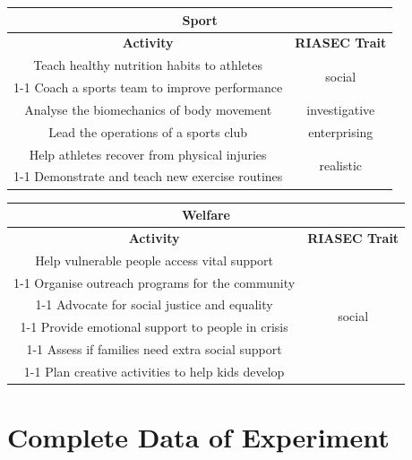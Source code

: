 \begin{table}[H]
\centering
\begin{tabular}{|c|c|}
\hline
\multicolumn{2}{|c|}{\textbf{Sport}}\\
\hline
\hline
\textbf{Activity} & \textbf{RIASEC Trait}\\
\hline
Teach healthy nutrition habits to athletes & \multirow{2}{*}{social}\\
\cline{1-1}
Coach a sports team to improve performance & \\
\hline
Analyse the biomechanics of body movement & investigative\\
\hline
Lead the operations of a sports club & enterprising\\
\hline
Help athletes recover from physical injuries & \multirow{2}{*}{realistic}\\
\cline{1-1}
Demonstrate and teach new exercise routines & \\
\hline
\end{tabular}
\end{table}

\begin{table}[H]
\centering
\begin{tabular}{|c|c|}
\hline
\multicolumn{2}{|c|}{\textbf{Welfare}}\\
\hline
\hline
\textbf{Activity} & \textbf{RIASEC Trait}\\
\hline
Help vulnerable people access vital support & \multirow{6}{*}{social}\\
\cline{1-1}
Organise outreach programs for the community & \\
\cline{1-1}
Advocate for social justice and equality & \\
\cline{1-1}
Provide emotional support to people in crisis & \\
\cline{1-1}
Assess if families need extra social support & \\
\cline{1-1}
Plan creative activities to help kids develop & \\
\hline
\end{tabular}
\end{table}

\section{Complete Data of Experiment}
\label{sec:all-results}

